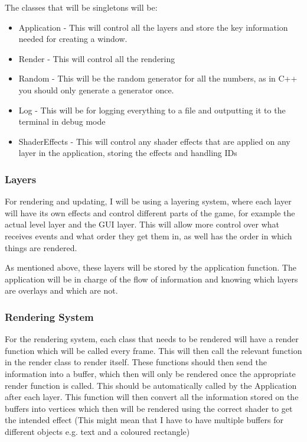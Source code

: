 \documentclass{article}
\begin{document}
                The classes that will be singletons will be:
                \begin{itemize}
                    \item Application - This will control all the layers and store the key information needed for creating a window.
                    \item Render - This will control all the rendering
                    \item Random - This will be the random generator for all the numbers, as in C++ you should only generate a generator once.
                    \item Log - This will be for logging everything to a file and outputting it to the terminal in debug mode
                    \item ShaderEffects - This will control any shader effects that are applied on any layer in the application, storing the effects and handling IDs
                \end{itemize}
            \subsubsection{Layers}
                For rendering and updating, I will be using a layering system, where each layer will have its own effects and control different parts of the game, for example the actual level layer and the GUI layer. This will allow more control over what receives events and what order they get them in, as well has the order in which things are rendered.

                As mentioned above, these layers will be stored by the application function. The application will be in charge of the flow of information and knowing which layers are overlays and which are not.
            \subsubsection{Rendering System}
                For the rendering system, each class that needs to be rendered will have a render function which will be called every frame. This will then call the relevant function in the render class to render itself. These functions should then send the information into a buffer, which then will only be rendered once the appropriate render function is called. This should be automatically called by the Application after each layer. This function will then convert all the information stored on the buffers into vertices which then will be rendered using the correct shader to get the intended effect (This might mean that I have to have multiple buffers for different objects e.g. text and a coloured rectangle)
\end{document}
